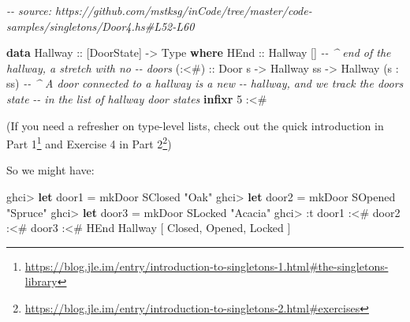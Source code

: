 \documentclass[]{article}
\newenvironment{Shaded}{}{}
\newcommand{\CommentTok}[1]{\textcolor[rgb]{0.38,0.63,0.69}{\textit{#1}}}
\newcommand{\DataTypeTok}[1]{\textcolor[rgb]{0.56,0.13,0.00}{#1}}
\newcommand{\DecValTok}[1]{\textcolor[rgb]{0.25,0.63,0.44}{#1}}
\newcommand{\KeywordTok}[1]{\textcolor[rgb]{0.00,0.44,0.13}{\textbf{#1}}}
\newcommand{\NormalTok}[1]{#1}
\newcommand{\OperatorTok}[1]{\textcolor[rgb]{0.40,0.40,0.40}{#1}}
\newcommand{\OtherTok}[1]{\textcolor[rgb]{0.00,0.44,0.13}{#1}}
\newcommand{\StringTok}[1]{\textcolor[rgb]{0.25,0.44,0.63}{#1}}
\renewcommand{\href}[2]{#2\footnote{\url{#1}}}
\begin{document}
\begin{Shaded}
\begin{Highlighting}[]
\CommentTok{{-}{-} source: https://github.com/mstksg/inCode/tree/master/code{-}samples/singletons/Door4.hs\#L52{-}L60}

\KeywordTok{data} \DataTypeTok{Hallway}\OtherTok{ ::}\NormalTok{ [}\DataTypeTok{DoorState}\NormalTok{] }\OtherTok{{-}>} \DataTypeTok{Type} \KeywordTok{where}
    \DataTypeTok{HEnd}\OtherTok{  ::} \DataTypeTok{Hallway}\NormalTok{ \textquotesingle{}[]        }\CommentTok{{-}{-} \^{} end of the hallway, a stretch with no}
                                \CommentTok{{-}{-}   doors}
\OtherTok{    (:<\#) ::} \DataTypeTok{Door}\NormalTok{ s}
          \OtherTok{{-}>} \DataTypeTok{Hallway}\NormalTok{ ss}
          \OtherTok{{-}>} \DataTypeTok{Hallway}\NormalTok{ (s \textquotesingle{}}\OperatorTok{:}\NormalTok{ ss)  }\CommentTok{{-}{-} \^{} A door connected to a hallway is a new}
                                \CommentTok{{-}{-}   hallway, and we track the door\textquotesingle{}s state}
                                \CommentTok{{-}{-}   in the list of hallway door states}
\KeywordTok{infixr} \DecValTok{5} \OperatorTok{:<\#}
\end{Highlighting}
\end{Shaded}

(If you need a refresher on type-level lists, check out
\href{https://blog.jle.im/entry/introduction-to-singletons-1.html\#the-singletons-library}{the
quick introduction in Part 1} and
\href{https://blog.jle.im/entry/introduction-to-singletons-2.html\#exercises}{Exercise
4 in Part 2})

So we might have:

\begin{Shaded}
\begin{Highlighting}[]
\NormalTok{ghci}\OperatorTok{>} \KeywordTok{let}\NormalTok{ door1 }\OtherTok{=}\NormalTok{ mkDoor }\DataTypeTok{SClosed} \StringTok{"Oak"}
\NormalTok{ghci}\OperatorTok{>} \KeywordTok{let}\NormalTok{ door2 }\OtherTok{=}\NormalTok{ mkDoor }\DataTypeTok{SOpened} \StringTok{"Spruce"}
\NormalTok{ghci}\OperatorTok{>} \KeywordTok{let}\NormalTok{ door3 }\OtherTok{=}\NormalTok{ mkDoor }\DataTypeTok{SLocked} \StringTok{"Acacia"}
\NormalTok{ghci}\OperatorTok{>} \OperatorTok{:}\NormalTok{t door1 }\OperatorTok{:<\#}\NormalTok{ door2 }\OperatorTok{:<\#}\NormalTok{ door3 }\OperatorTok{:<\#} \DataTypeTok{HEnd}
\DataTypeTok{Hallway}\NormalTok{ \textquotesingle{}[ }\DataTypeTok{\textquotesingle{}Closed}\NormalTok{, }\DataTypeTok{\textquotesingle{}Opened}\NormalTok{, }\DataTypeTok{\textquotesingle{}Locked}\NormalTok{ ]}
\end{Highlighting}
\end{Shaded}
\end{document}
